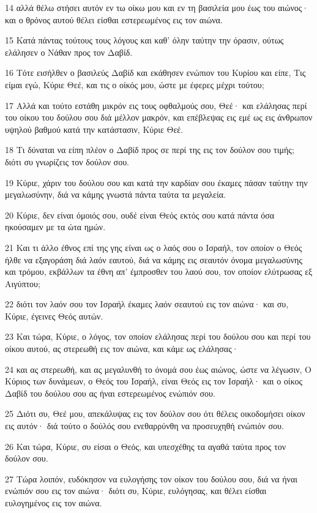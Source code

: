 \par 14 αλλά θέλω στήσει αυτόν εν τω οίκω μου και εν τη βασιλεία μου έως του αιώνος· και ο θρόνος αυτού θέλει είσθαι εστερεωμένος εις τον αιώνα.
\par 15 Κατά πάντας τούτους τους λόγους και καθ' όλην ταύτην την όρασιν, ούτως ελάλησεν ο Νάθαν προς τον Δαβίδ.
\par 16 Τότε εισήλθεν ο βασιλεύς Δαβίδ και εκάθησεν ενώπιον του Κυρίου και είπε, Τις είμαι εγώ, Κύριε Θεέ, και τις ο οίκός μου, ώστε με έφερες μέχρι τούτου;
\par 17 Αλλά και τούτο εστάθη μικρόν εις τους οφθαλμούς σου, Θεέ· και ελάλησας περί του οίκου του δούλου σου διά μέλλον μακρόν, και επέβλεψας εις εμέ ως εις άνθρωπον υψηλού βαθμού κατά την κατάστασιν, Κύριε Θεέ.
\par 18 Τι δύναται να είπη πλέον ο Δαβίδ προς σε περί της εις τον δούλον σου τιμής; διότι συ γνωρίζεις τον δούλον σου.
\par 19 Κύριε, χάριν του δούλου σου και κατά την καρδίαν σου έκαμες πάσαν ταύτην την μεγαλωσύνην, διά να κάμης γνωστά πάντα ταύτα τα μεγαλεία.
\par 20 Κύριε, δεν είναι όμοιός σου, ουδέ είναι Θεός εκτός σου κατά πάντα όσα ηκούσαμεν με τα ώτα ημών.
\par 21 Και τι άλλο έθνος επί της γης είναι ως ο λαός σου ο Ισραήλ, τον οποίον ο Θεός ήλθε να εξαγοράση διά λαόν εαυτού, διά να κάμης εις σεαυτόν όνομα μεγαλωσύνης και τρόμου, εκβάλλων τα έθνη απ' έμπροσθεν του λαού σου, τον οποίον ελύτρωσας εξ Αιγύπτου;
\par 22 διότι τον λαόν σου τον Ισραήλ έκαμες λαόν σεαυτού εις τον αιώνα· και συ, Κύριε, έγεινες Θεός αυτών.
\par 23 Και τώρα, Κύριε, ο λόγος, τον οποίον ελάλησας περί του δούλου σου και περί του οίκου αυτού, ας στερεωθή εις τον αιώνα, και κάμε ως ελάλησας·
\par 24 και ας στερεωθή, και ας μεγαλυνθή το όνομά σου έως αιώνος, ώστε να λέγωσιν, Ο Κύριος των δυνάμεων, ο Θεός του Ισραήλ, είναι Θεός εις τον Ισραήλ· και ο οίκος Δαβίδ του δούλου σου ας ήναι εστερεωμένος ενώπιόν σου.
\par 25 Διότι συ, Θεέ μου, απεκάλυψας εις τον δούλον σου ότι θέλεις οικοδομήσει οίκον εις αυτόν· διά τούτο ο δούλός σου ενεθαρρύνθη να προσευχηθή ενώπιόν σου.
\par 26 Και τώρα, Κύριε, συ είσαι ο Θεός, και υπεσχέθης τα αγαθά ταύτα προς τον δούλον σου.
\par 27 Τώρα λοιπόν, ευδόκησον να ευλογήσης τον οίκον του δούλου σου, διά να ήναι ενώπιόν σου εις τον αιώνα· διότι συ, Κύριε, ευλόγησας, και θέλει είσθαι ευλογημένος εις τον αιώνα.

